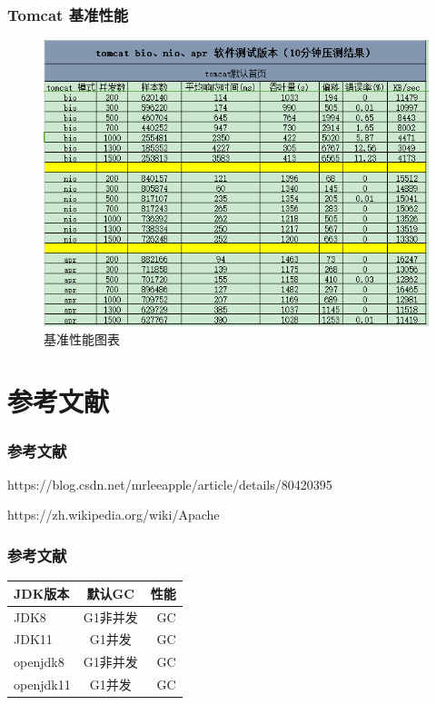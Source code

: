 \documentclass{beamer}
\begin{document}
\begin{frame}
\frametitle{Tomcat 基准性能}
\begin{figure}[ht]
	
	\centering
	\includegraphics[scale=0.45]{img/benchmark.png}
	\caption{基准性能图表}
	\label{fig:pathdemo1}
\end{figure}

\end{frame}


\section{参考文献}

\begin{frame}[allowframebreaks]
    \frametitle{参考文献}
    \small
    
    
    https://blog.csdn.net/mrleeapple/article/details/80420395
    
    https://zh.wikipedia.org/wiki/Apache%
\end{frame}

\begin{frame}[allowframebreaks]
\frametitle{参考文献}
\centering
\begin{tabular}{|l|c|r|}
	\hline 
	\large	JDK版本 &  \large 默认GC&  \large 性能 \\
	\hline 
	JDK8 & G1非并发 &  GC \\
	\hline 
	JDK11 & G1并发 & GC \\
	\hline 
	openjdk8 & G1非并发& GC  \\
	\hline 
	openjdk11& G1并发 & GC \\
	\hline
\end{tabular}
\end{frame}
\end{document}

